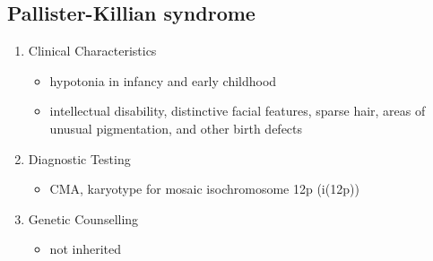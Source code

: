 \documentclass[12pt]{scrartcl}
\begin{document}
\subsection{Pallister-Killian syndrome}
\label{sec:orge776e55}
\begin{enumerate}
\item Clinical Characteristics
\label{sec:org6dad97c}
\begin{itemize}
\item hypotonia in infancy and early childhood
\item intellectual disability, distinctive facial features, sparse hair,
areas of unusual pigmentation, and other birth defects
\end{itemize}

\item Diagnostic Testing
\label{sec:orgc8337ed}
\begin{itemize}
\item CMA, karyotype for mosaic isochromosome 12p (i(12p))
\end{itemize}

\item Genetic Counselling
\label{sec:org010bde8}
\begin{itemize}
\item not inherited
\end{itemize}
\end{enumerate}
\end{document}
